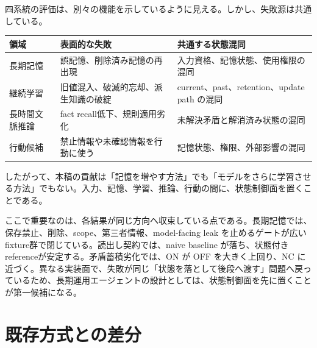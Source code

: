 \documentclass[12pt,a4paper]{article}
\begin{document}
四系統の評価は、別々の機能を示しているように見える。しかし、失敗源は共通している。

{\def\LTcaptype{table} %
\begin{longtable}[]{@{}
  >{\raggedright\arraybackslash}p{}
  >{\raggedright\arraybackslash}p{}
  >{\raggedright\arraybackslash}p{}@{}}
\toprule\noalign{}
\begin{minipage}[b]{\linewidth}\raggedright
領域
\end{minipage} & \begin{minipage}[b]{\linewidth}\raggedright
表面的な失敗
\end{minipage} & \begin{minipage}[b]{\linewidth}\raggedright
共通する状態混同
\end{minipage} \\
\midrule\noalign{}
\endhead
\bottomrule\noalign{}
\endlastfoot
長期記憶 & 誤記憶、削除済み記憶の再出現 & 入力資格、記憶状態、使用権限の混同 \\
継続学習 & 旧値混入、破滅的忘却、派生知識の破綻 & current、past、retention、update path の混同 \\
長時間文脈推論 & fact recall低下、規則適用劣化 & 未解決矛盾と解消済み状態の混同 \\
行動候補 & 禁止情報や未確認情報を行動に使う & 記憶状態、権限、外部影響の混同 \\
\end{longtable}
}

したがって、本稿の貢献は「記憶を増やす方法」でも「モデルをさらに学習させる方法」でもない。入力、記憶、学習、推論、行動の間に、状態制御面を置くことである。

ここで重要なのは、各結果が同じ方向へ収束している点である。長期記憶では、保存禁止、削除、scope、第三者情報、model-facing leak を止めるゲートが広いfixture群で閉じている。読出し契約では、naive baseline が落ち、状態付きreferenceが安定する。矛盾蓄積劣化では、ON が OFF を大きく上回り、NC に近づく。異なる実装面で、失敗が同じ「状態を落として後段へ渡す」問題へ戻っているため、長期運用エージェントの設計としては、状態制御面を先に置くことが第一候補になる。

\section{既存方式との差分}\label{ux65e2ux5b58ux65b9ux5f0fux3068ux306eux5deeux5206}
\end{document}
